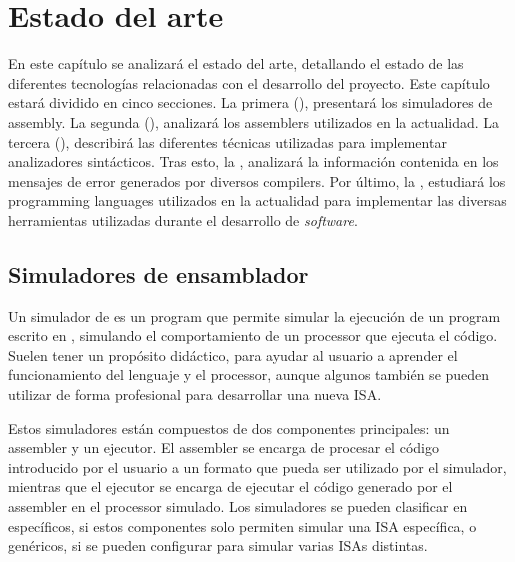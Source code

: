 \chapter{Estado del arte}\label{chap:state-of-the-art}

En este capítulo se analizará el estado del arte, detallando el estado de las
diferentes tecnologías relacionadas con el desarrollo del proyecto. Este
capítulo estará dividido en cinco secciones. La primera
(), presentará los simuladores de \gls{assembly}. La
segunda (), analizará los \glspl{assembler} utilizados en
la actualidad. La tercera (), describirá las
diferentes técnicas utilizadas para implementar analizadores sintácticos. Tras
esto, la , analizará la información contenida en los
mensajes de error generados por diversos \glspl{compiler}. Por último, la
, estudiará los \glspl{programming language}
utilizados en la actualidad para implementar las diversas herramientas
utilizadas durante el desarrollo de \textit{software}.


\section{Simuladores de ensamblador}\label{sec:simulators}

Un simulador de  es un \gls{program} que permite
simular la ejecución de un \gls{program} escrito en ,
simulando el comportamiento de un \gls{processor} que ejecuta el código. Suelen
tener un propósito didáctico, para ayudar al usuario a aprender el
funcionamiento del lenguaje y el \gls{processor}, aunque algunos también se
pueden utilizar de forma profesional para desarrollar una nueva \gls{ISA}.

Estos simuladores están compuestos de dos componentes principales: un
\gls{assembler} y un ejecutor. El \gls{assembler} se encarga de procesar el
código  introducido por el usuario a un formato
que pueda ser utilizado por el simulador, mientras que el ejecutor se encarga
de ejecutar el código generado por el \gls{assembler} en el \gls{processor}
simulado. Los simuladores se pueden clasificar en específicos, si estos componentes
solo permiten simular una \gls{ISA} específica, o genéricos, si se pueden
configurar para simular varias \glspl{ISA} distintas.

